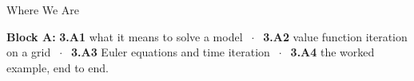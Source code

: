 

\graphicspath{{./figures/}}





\makedecktitle

\begin{frame}{Where We Are}
\vspace{-1mm}
\begin{center}
\small \textbf{Block A:} \textbf{3.A1} what it means to solve a model $\;\cdot\;$ \textbf{3.A2} value function iteration on a grid $\;\cdot\;$ \textbf{3.A3} Euler equations and time iteration $\;\cdot\;$ \textbf{3.A4} the worked example, end to end.
\end{center}
\end{frame}

